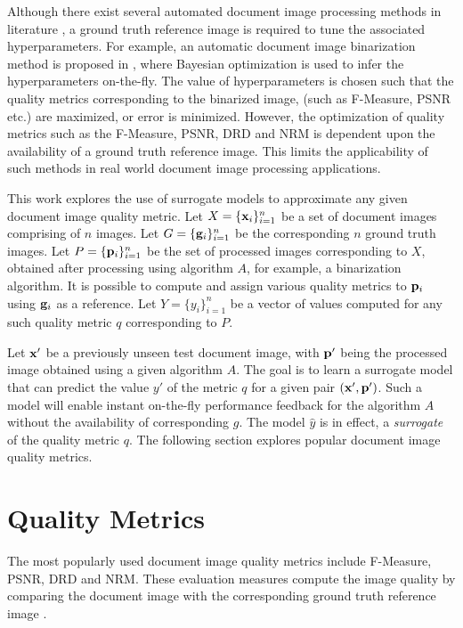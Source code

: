 \documentclass[10pt, a4paper, conference, compsocconf]{IEEEtran}
\begin{document}
Although there exist several automated document image processing methods in literature \cite{vats2017automatic, howe2013document}, a ground truth reference image is required to tune the associated hyperparameters. For example, an automatic document image binarization method is proposed in \cite{vats2017automatic}, where Bayesian optimization is used to infer the hyperparameters on-the-fly. The value of hyperparameters is chosen such that the quality metrics corresponding to the binarized image, (such as F-Measure, PSNR etc.) are maximized, or error is minimized. However, the optimization of quality metrics such as the F-Measure, PSNR, DRD and NRM is dependent upon the availability of a ground truth reference image. This limits the applicability of such methods in real world document image processing applications.


This work explores the use of surrogate models to approximate any given document image quality metric. Let $X=\{{\bf x}_i\}_{i=1}^n$ be a set of document images comprising of $n$ images. Let $G=\{{\bf g}_i\}_{i=1}^n$ be the corresponding $n$ ground truth images. Let $P=\{{\bf p}_i\}_{i=1}^n$ be the set of processed images corresponding to $X$, obtained after processing using algorithm $A$, for example, a binarization algorithm. It is possible to compute and assign various quality metrics to ${\bf p}_i$ using ${\bf g}_i$ as a reference. Let $Y=\{y_i\}_{i=1}^n$ be a vector of values computed for any such quality metric $q$ corresponding to $P$. 

Let ${\bf x}'$ be a previously unseen test document image, with ${\bf p}'$ being the processed image obtained using a given algorithm $A$. The goal is to learn a surrogate model that can predict the value $y'$ of the metric $q$ for a given pair $({\bf x}', {\bf p}')$. Such a model will enable instant on-the-fly performance feedback for the algorithm $A$ without the availability of corresponding $g$. The model $\hat{y}$ is in effect, a \emph{surrogate} of the quality metric $q$. The following section explores popular document image quality metrics.

\section{Quality Metrics}
\label{sec:doc}
The most popularly used document image quality metrics include F-Measure, PSNR, DRD and NRM. These evaluation measures compute the image quality by comparing the document image with the corresponding ground truth reference image \cite{gatos2009icdar,
pratikakis2016icfhr2016}. 
\end{document}
